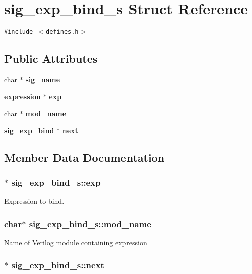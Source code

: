 \section{sig\_\-exp\_\-bind\_\-s  Struct Reference}
\label{structsig__exp__bind__s}
{\tt \#include $<$defines.h$>$}

\subsection*{Public Attributes}
\begin{CompactItemize}
\item 
char $\ast$ {\bf sig\_\-name}
\item 
{\bf expression} $\ast$ {\bf exp}
\item 
char $\ast$ {\bf mod\_\-name}
\item 
{\bf sig\_\-exp\_\-bind} $\ast$ {\bf next}
\end{CompactItemize}


\subsection{Member Data Documentation}
\subsubsection{$\ast$ sig\_\-exp\_\-bind\_\-s::exp}\label{structsig__exp__bind__s_m1}


Expression to bind. 
\subsubsection{\setlength{\rightskip}{0pt plus 5cm}char$\ast$ sig\_\-exp\_\-bind\_\-s::mod\_\-name}\label{structsig__exp__bind__s_m2}


Name of Verilog module containing expression 
\subsubsection{$\ast$ sig\_\-exp\_\-bind\_\-s::next}\label{structsig__exp__bind__s_m3}


